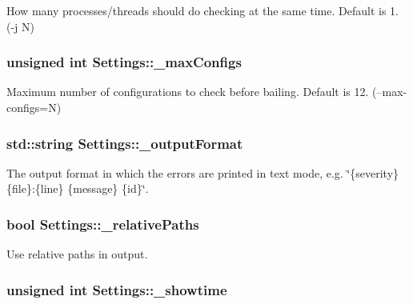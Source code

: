 How many processes/threads should do checking at the same time. Default is 1. (-\/j N) 

\hypertarget{class_settings_ab7e1b0a42a74f4203816663f878b3db2}{
\subsubsection[{\-\_\-max\-Configs}]{\setlength{\rightskip}{0pt plus 5cm}unsigned int Settings\-::\-\_\-max\-Configs}}\label{class_settings_ab7e1b0a42a74f4203816663f878b3db2}


Maximum number of configurations to check before bailing. Default is 12. (--max-\/configs=N) 

\hypertarget{class_settings_ac28b2437de15405caeaa89dce1c2a669}{
\subsubsection[{\-\_\-output\-Format}]{\setlength{\rightskip}{0pt plus 5cm}std\-::string Settings\-::\-\_\-output\-Format}}\label{class_settings_ac28b2437de15405caeaa89dce1c2a669}


The output format in which the errors are printed in text mode, e.\-g. \char`\"{}\{severity\} \{file\}\-:\{line\} \{message\} \{id\}\char`\"{}. 

\hypertarget{class_settings_ab99c72c997d7b2f6f8985c0ced0881ac}{
\subsubsection[{\-\_\-relative\-Paths}]{\setlength{\rightskip}{0pt plus 5cm}bool Settings\-::\-\_\-relative\-Paths}}\label{class_settings_ab99c72c997d7b2f6f8985c0ced0881ac}


Use relative paths in output. 

\hypertarget{class_settings_a2b369b09fa11c6488c96c3843bb19e83}{
\subsubsection[{\-\_\-showtime}]{\setlength{\rightskip}{0pt plus 5cm}unsigned int Settings\-::\-\_\-showtime}}\label{class_settings_a2b369b09fa11c6488c96c3843bb19e83}


